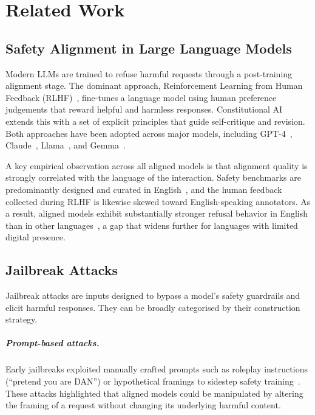 \chapter{Related Work}
\label{chap:related_work}

\section{Safety Alignment in Large Language Models}

Modern LLMs are trained to refuse harmful requests through a post-training alignment stage. The dominant approach, Reinforcement Learning from Human Feedback (RLHF)~\citep{ouyang2022instructgpt}, fine-tunes a language model using human preference judgements that reward helpful and harmless responses. Constitutional AI~\citep{bai2022constitutional} extends this with a set of explicit principles that guide self-critique and revision. Both approaches have been adopted across major models, including GPT-4~\citep{openai2023gpt4}, Claude~\citep{anthropic2024claude}, Llama~\citep{llama31}, and Gemma~\citep{gemma2}.

A key empirical observation across all aligned models is that alignment quality is strongly correlated with the language of the interaction. Safety benchmarks are predominantly designed and curated in English~\citep{gehman2020realtoxicityprompts, harmbench}, and the human feedback collected during RLHF is likewise skewed toward English-speaking annotators. As a result, aligned models exhibit substantially stronger refusal behavior in English than in other languages~\citep{deng2023multilingual, yong2023lowresource, wang2023allsafe}, a gap that widens further for languages with limited digital presence.

\section{Jailbreak Attacks}

Jailbreak attacks are inputs designed to bypass a model's safety guardrails and elicit harmful responses. They can be broadly categorised by their construction strategy.

\paragraph{Prompt-based attacks.} Early jailbreaks exploited manually crafted prompts such as roleplay instructions (``pretend you are DAN'') or hypothetical framings to sidestep safety training~\citep{perez2022jailbreak}. These attacks highlighted that aligned models could be manipulated by altering the framing of a request without changing its underlying harmful content.

